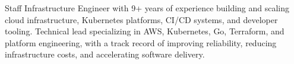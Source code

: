 

\begin{cvparagraph}
    Staff Infrastructure Engineer with 9+ years of experience building and scaling cloud infrastructure, Kubernetes platforms, CI/CD systems, and developer tooling. Technical lead specializing in AWS, Kubernetes, Go, Terraform, and platform engineering, with a track record of improving reliability, reducing infrastructure costs, and accelerating software delivery.
\end{cvparagraph}
